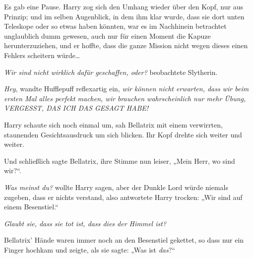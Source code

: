 Es gab eine Pause. Harry zog sich den Umhang wieder über den Kopf, nur aus Prinzip; und im selben Augenblick, in dem ihm klar wurde, dass sie dort unten Teleskope oder so etwas haben könnten, war es im Nachhinein betrachtet unglaublich dumm gewesen, auch nur für einen Moment die Kapuze herunterzuziehen, und er hoffte, dass die ganze Mission nicht wegen dieses einen Fehlers scheitern würde…

\emph{Wir sind nicht wirklich dafür geschaffen, oder?} beobachtete Slytherin.

\emph{Hey}, wandte Hufflepuff reflexartig ein, \emph{wir können nicht erwarten, dass wir beim ersten Mal alles perfekt machen, wir brauchen wahrscheinlich nur mehr Übung, VERGESST, DAS ICH DAS GESAGT HABE!}

Harry schaute sich noch einmal um, sah Bellatrix mit einem verwirrten, staunenden Gesichtsausdruck um sich blicken. Ihr Kopf drehte sich weiter und weiter.

Und schließlich sagte Bellatrix, ihre Stimme nun leiser, „Mein Herr, wo sind wir?“.

\emph{Was meinst du?} wollte Harry sagen, aber der Dunkle Lord würde niemals zugeben, dass er nichts verstand, also antwortete Harry trocken: „Wir sind auf einem Besenstiel.“

\emph{Glaubt sie, dass sie tot ist, dass dies der Himmel ist?}

Bellatrix’ Hände waren immer noch an den Besenstiel gekettet, so dass nur ein Finger hochkam und zeigte, als sie sagte: „Was ist \emph{das}?“

